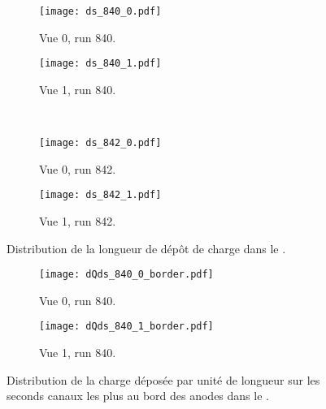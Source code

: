       \begin{figure}[htbp]
        \centering
        \begin{subfigure}[t]{0.48\textwidth}
          \centering
          \texttt{[image: ds\_840\_0.pdf]}
          \caption{Vue 0, run 840.}
        \end{subfigure}\hfill
        \begin{subfigure}[t]{0.48\textwidth}
          \centering
          \texttt{[image: ds\_840\_1.pdf]}
          \caption{Vue 1, run 840.}
        \end{subfigure}\\
        \begin{subfigure}[t]{0.48\textwidth}
          \centering
          \texttt{[image: ds\_842\_0.pdf]}
          \caption{Vue 0, run 842.}
        \end{subfigure}\hfill
        \begin{subfigure}[t]{0.48\textwidth}
          \centering
          \texttt{[image: ds\_842\_1.pdf]}
          \caption{Vue 1, run 842.}
        \end{subfigure}
        \caption[Distribution de la longueur de dépôt de charge dans le \TOO{}]{\label{fig::ds_840_842}Distribution de la longueur de dépôt de charge dans le \TOO{}.}
      \end{figure}

      \begin{figure}[htbp]
        \centering
        \begin{subfigure}[t]{0.48\textwidth}
          \centering
          \texttt{[image: dQds\_840\_0\_border.pdf]}
          \caption{Vue 0, run 840.}
        \end{subfigure}\hfill
        \begin{subfigure}[t]{0.48\textwidth}
          \centering
          \texttt{[image: dQds\_840\_1\_border.pdf]}
          \caption{Vue 1, run 840.}
        \end{subfigure}
        \caption[Effet des zones mortes des LEMs dans le \TOO{}]{\label{fig::dqds_840_borders}Distribution de la charge déposée par unité de longueur sur les seconds canaux les plus au bord des anodes dans le \TOO{}.}
      \end{figure}


